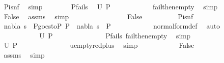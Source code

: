 \begin{isabellebody}
\ P{\isacharunderscore}{\kern0pt}is{\isacharunderscore}{\kern0pt}nf\ \isamarkupfalse%
\ simp\isanewline
\ \ \ \ \ \ \isamarkupfalse%
\ P{\isacharunderscore}{\kern0pt}fails\ \isamarkupfalse%
\ {\isachardoublequoteopen}U\ P{}\ {\isacharequal}{\kern0pt}\ {\isacharbraceleft}{\kern0pt}{\isacharbraceright}{\kern0pt}{\isachardoublequoteclose}\isanewline
\ \ \ \ \ \ \ \ \isamarkupfalse%
\ fail{\isacharunderscore}{\kern0pt}then{\isacharunderscore}{\kern0pt}empty\ \isamarkupfalse%
\ simp\isanewline
\ \ \ \ \ \ \isamarkupfalse%
\ False\ \isamarkupfalse%
\ assms\ \isamarkupfalse%
\ simp\isanewline
\ \ \ \ \ \ \isamarkupfalse%
\isanewline
\ \ \ \ \ \ \ \ \isamarkupfalse%
\ False\isanewline
\ \ \ \ \ \ \ \ \isamarkupfalse%
\ P{\isacharunderscore}{\kern0pt}is{\isacharunderscore}{\kern0pt}nf\isanewline
\ \ \ \ \ \ \ \ \isamarkupfalse%
\ nabla\ s\ \ P{}{\isacharunderscore}{\kern0pt}goes{\isacharunderscore}{\kern0pt}to{\isacharunderscore}{\kern0pt}P{\isacharcolon}{\kern0pt}\ {\isachardoublequoteopen}P{}\ {\isasymTurnstile}\ {\isacharparenleft}{\kern0pt}nabla{\isacharcomma}{\kern0pt}\ s{\isacharparenright}{\kern0pt}\ {\isasymRightarrow}\ P{\isachardoublequoteclose}\isanewline
\ \ \ \ \ \ \ \ \ \ \isamarkupfalse%
\ normal{\isacharunderscore}{\kern0pt}form{\isacharunderscore}{\kern0pt}def\ \isamarkupfalse%
\ auto\isanewline
\ \ \ \ \ \ \ \ \isamarkupfalse%
\ \isamarkupfalse%
\ {\isachardoublequoteopen}U\ P\ {\isacharequal}{\kern0pt}\ {\isacharbraceleft}{\kern0pt}{\isacharbraceright}{\kern0pt}{\isachardoublequoteclose}\ \isanewline
\ \ \ \ \ \ \ \ \ \ \isamarkupfalse%
\ P{\isacharunderscore}{\kern0pt}fails\ fail{\isacharunderscore}{\kern0pt}then{\isacharunderscore}{\kern0pt}empty\ \isamarkupfalse%
\ simp\isanewline
\ \ \ \ \ \ \ \ \isamarkupfalse%
\ \isamarkupfalse%
\ {\isachardoublequoteopen}U\ P{}\ {\isacharequal}{\kern0pt}\ {\isacharbraceleft}{\kern0pt}{\isacharbraceright}{\kern0pt}{\isachardoublequoteclose}\ \isanewline
\ \ \ \ \ \ \ \ \ \ \isamarkupfalse%
\ u{\isacharunderscore}{\kern0pt}empty{\isacharunderscore}{\kern0pt}red{\isacharunderscore}{\kern0pt}plus\ \isamarkupfalse%
\ simp\isanewline
\ \ \ \ \ \ \ \ \isamarkupfalse%
\ \isamarkupfalse%
\ False\ \isanewline
\ \ \ \ \ \ \ \ \ \ \isamarkupfalse%
\ assms\ \isamarkupfalse%
\ simp\isanewline
\ \ \ \ \ \ \isamarkupfalse%
\isanewline
\ \ \ \ \isamarkupfalse%
\isanewline
\ \ \isamarkupfalse%
%
\endisatagproof
{\isafoldproof}%
%
\isadelimproof
\isanewline
%
\endisadelimproof
\isanewline
\isanewline
\isanewline
%
\isadelimtheory
%
\endisadelimtheory
%
\isatagtheory
%
\endisatagtheory
{\isafoldtheory}%
%
\isadelimtheory
%
\endisadelimtheory
%
\end{isabellebody}%
